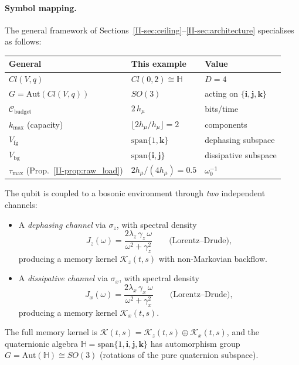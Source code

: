 \documentclass[12pt,a4paper,openany]{book}
\begin{document}
\paragraph{Symbol mapping.}
The general framework of Sections~\ref{II-sec:ceiling}--\ref{II-sec:architecture}
specialises as follows:
\begin{center}
\small
\begin{tabular}{@{}lll@{}}
\toprule
General & This example & Value \\
\midrule
$Cl(V,q)$ & $Cl(0,2) \cong \mathbb{H}$
  & $D = 4$ \\
$G = \mathrm{Aut}(Cl(V,q))$ & $SO(3)$
  & acting on $\{\mathbf{i},\mathbf{j},\mathbf{k}\}$\\
$\mathcal{C}_{\mathrm{budget}}$ & $2\,h_\mu$
  & bits/time \\
$k_{\max}$ (capacity)
  & $\lfloor 2h_\mu / h_\mu \rfloor = 2$
  & components \\
$V_{\mathrm{fg}}$ & $\mathrm{span}\{1,\mathbf{k}\}$
  & dephasing subspace \\
$V_{\mathrm{bg}}$ & $\mathrm{span}\{\mathbf{i},\mathbf{j}\}$
  & dissipative subspace \\
$\tau_{\max}$ (Prop.~\ref{II-prop:raw_load})
  & $2h_\mu / (4h_\mu) = 0.5$
  & $\omega_0^{-1}$ \\
\bottomrule
\end{tabular}
\end{center}
The qubit is coupled to a bosonic environment through
\emph{two} independent channels:
\begin{itemize}
\item A \emph{dephasing channel} via $\sigma_z$, with
  spectral density
  \begin{equation}
  \label{II-eq:J_z}
  J_z(\omega)
  = \frac{2\lambda_z\,\gamma_z\,\omega}
         {\omega^2 + \gamma_z^2}
  \qquad\text{(Lorentz--Drude)},
  \end{equation}
  producing a memory kernel $\mathcal{K}_z(t,s)$ with
  non-Markovian backflow.
\item A \emph{dissipative channel} via $\sigma_x$, with
  spectral density
  \begin{equation}
  \label{II-eq:J_x}
  J_x(\omega)
  = \frac{2\lambda_x\,\gamma_x\,\omega}
         {\omega^2 + \gamma_x^2}
  \qquad\text{(Lorentz--Drude)},
  \end{equation}
  producing a memory kernel $\mathcal{K}_x(t,s)$.
\end{itemize}

The full memory kernel is
$\mathcal{K}(t,s)
= \mathcal{K}_z(t,s) \oplus \mathcal{K}_x(t,s)$,
and the quaternionic algebra
$\mathbb{H} = \mathrm{span}\{1, \mathbf{i}, \mathbf{j},
\mathbf{k}\}$
has automorphism group
$G = \mathrm{Aut}(\mathbb{H}) \cong SO(3)$
(rotations of the pure quaternion subspace).
\end{document}
